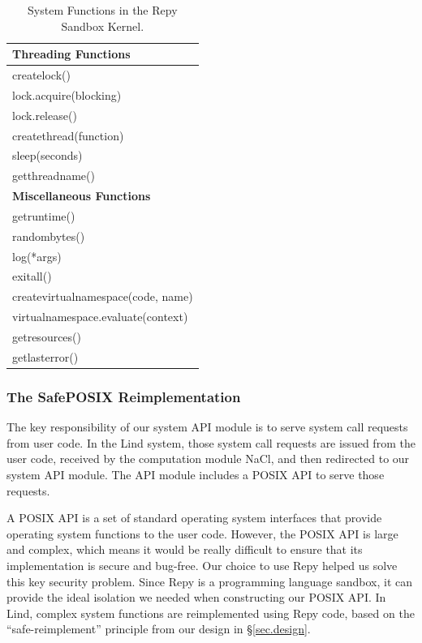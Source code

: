\begin{table}
\begin{tabular}{|l|}
  \hline \hline
  \textbf{Threading Functions} \\
  \hline
  createlock() \\
  \hline
  lock.acquire(blocking) \\
  \hline
  lock.release() \\
  \hline
  createthread(function) \\
  \hline
  sleep(seconds) \\
  \hline
  getthreadname() \\
  \hline \hline
  \textbf{Miscellaneous Functions} \\
  \hline
  getruntime() \\
  \hline
  randombytes() \\
  \hline
  log(*args) \\
  \hline
  exitall() \\
  \hline
  createvirtualnamespace(code, name) \\
  \hline
  virtualnamespace.evaluate(context) \\
  \hline
  getresources() \\
  \hline
  getlasterror() \\
  \hline
\end{tabular}
\caption {System Functions in the Repy Sandbox Kernel.  }
\label{table:RepyKernel}
\end{table}

\subsubsection{The SafePOSIX Reimplementation}

The key responsibility of our system API module is to serve system call requests from user code. 
In the Lind system, those system call requests are issued from the user code, 
received by the computation module NaCl, and then redirected to our system API module. 
The API module includes a POSIX API to serve those requests. 

A POSIX API is a set of standard operating system interfaces that provide operating system functions 
to the user code. However, the POSIX API is large and complex, which means 
it would be really difficult to ensure that its implementation is secure and bug-free. 
Our choice to use Repy helped us solve this key security problem. 
Since Repy is a programming language sandbox, it can provide the ideal isolation 
we needed when constructing our POSIX API. In Lind, 
complex system functions are reimplemented using Repy code, 
based on the ``safe-reimplement'' principle from our design in \S{\ref{sec.design}}.

